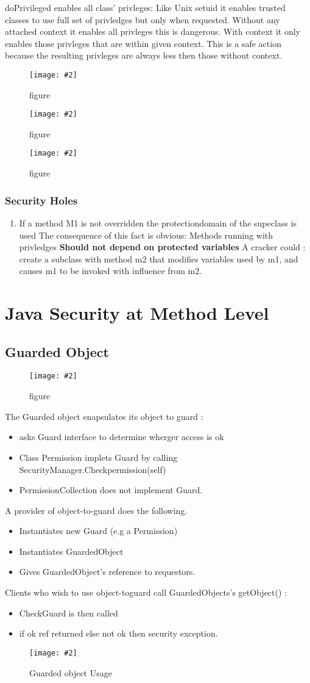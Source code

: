 \documentclass[a4paper,10pt]{scrreprt}
\newcommand{\pic}[2][figure]{\begin{figure}[h]
 \centering
 \texttt{[image: \#2]}
 \caption{#1}
\end{figure}
}
\begin{document}
doPrivileged enables all class' privleges: Like Unix setuid it enables trusted classes to use full set of privledges 
but only when requested. Without any attached context it enables all privleges this is dangerous. With context it only 
enables those privleges that are within given context. This is a safe action because the resulting privleges are always 
less then those without context.

\pic{pex1.png}
\pic{pex2.png}
\pic{pex3.png}

\subsection{Security Holes}

\begin{enumerate}
 \item If a method M1 is not overridden the protectiondomain of the supeclass is used
 \subitem The consequence of this fact is obvious: Methods running with privledges \textbf{Should not depend on 
protected variables}
\subitem A cracker could : create a subclass with method m2 that modifies variables used by m1, and causes m1 to be 
invoked with influence from m2.
\end{enumerate}

\chapter{Java Security at Method Level}
\section{Guarded Object}
\pic{go.png}
The Guarded object enapsulates its object to guard : 
\begin{itemize}
 \item asks Guard interface to determine wherger access is ok
 \item Class Permission implets Guard by calling SecurityManager.Checkpermission(self)
 \item PermissionCollection does not implement Guard.
\end{itemize}
A provider of object-to-guard does the following.
\begin{itemize}
 \item Instantiates new Guard (e.g a Permission)
 \item Instantiates GuardedObject
 \item Gives GuardedObject's reference to requestors.
\end{itemize}
Clients who wish to use object-toguard call GuardedObjects's getObject() :
\begin{itemize}
 \item CheckGuard is then called
 \item if ok ref returned else not ok then security exception.
\end{itemize}
\pic[Guarded object Usage]{gousage.png}
\end{document}
